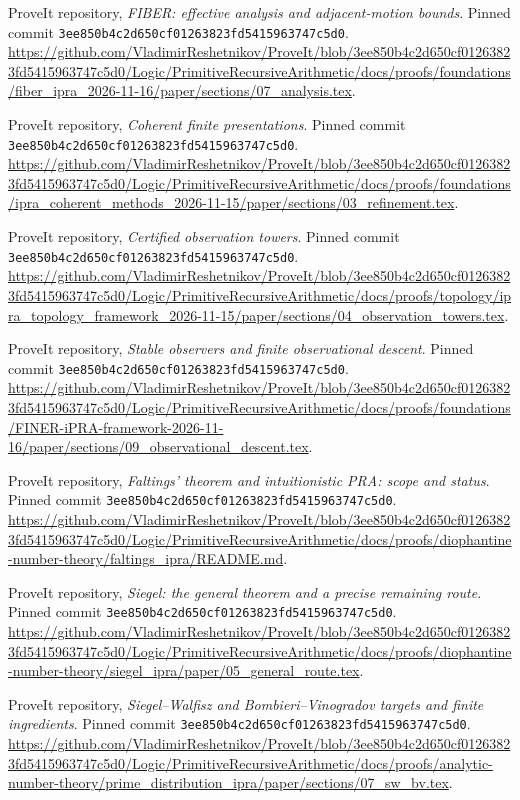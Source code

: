  ProveIt repository, \emph{FIBER: effective analysis and adjacent-motion bounds}.
Pinned commit \texttt{3ee850b4c2d650cf01263823fd5415963747c5d0}.
\url{https://github.com/VladimirReshetnikov/ProveIt/blob/3ee850b4c2d650cf01263823fd5415963747c5d0/Logic/PrimitiveRecursiveArithmetic/docs/proofs/foundations/fiber_ipra_2026-11-16/paper/sections/07_analysis.tex}.

 ProveIt repository, \emph{Coherent finite presentations}.
Pinned commit \texttt{3ee850b4c2d650cf01263823fd5415963747c5d0}.
\url{https://github.com/VladimirReshetnikov/ProveIt/blob/3ee850b4c2d650cf01263823fd5415963747c5d0/Logic/PrimitiveRecursiveArithmetic/docs/proofs/foundations/ipra_coherent_methods_2026-11-15/paper/sections/03_refinement.tex}.

 ProveIt repository, \emph{Certified observation towers}.
Pinned commit \texttt{3ee850b4c2d650cf01263823fd5415963747c5d0}.
\url{https://github.com/VladimirReshetnikov/ProveIt/blob/3ee850b4c2d650cf01263823fd5415963747c5d0/Logic/PrimitiveRecursiveArithmetic/docs/proofs/topology/ipra_topology_framework_2026-11-15/paper/sections/04_observation_towers.tex}.

 ProveIt repository, \emph{Stable observers and finite observational descent}.
Pinned commit \texttt{3ee850b4c2d650cf01263823fd5415963747c5d0}.
\url{https://github.com/VladimirReshetnikov/ProveIt/blob/3ee850b4c2d650cf01263823fd5415963747c5d0/Logic/PrimitiveRecursiveArithmetic/docs/proofs/foundations/FINER-iPRA-framework-2026-11-16/paper/sections/09_observational_descent.tex}.

 ProveIt repository, \emph{Faltings' theorem and intuitionistic PRA: scope and status}.
Pinned commit \texttt{3ee850b4c2d650cf01263823fd5415963747c5d0}.
\url{https://github.com/VladimirReshetnikov/ProveIt/blob/3ee850b4c2d650cf01263823fd5415963747c5d0/Logic/PrimitiveRecursiveArithmetic/docs/proofs/diophantine-number-theory/faltings_ipra/README.md}.

 ProveIt repository, \emph{Siegel: the general theorem and a precise remaining route}.
Pinned commit \texttt{3ee850b4c2d650cf01263823fd5415963747c5d0}.
\url{https://github.com/VladimirReshetnikov/ProveIt/blob/3ee850b4c2d650cf01263823fd5415963747c5d0/Logic/PrimitiveRecursiveArithmetic/docs/proofs/diophantine-number-theory/siegel_ipra/paper/05_general_route.tex}.

 ProveIt repository, \emph{Siegel--Walfisz and Bombieri--Vinogradov targets and finite ingredients}.
Pinned commit \texttt{3ee850b4c2d650cf01263823fd5415963747c5d0}.
\url{https://github.com/VladimirReshetnikov/ProveIt/blob/3ee850b4c2d650cf01263823fd5415963747c5d0/Logic/PrimitiveRecursiveArithmetic/docs/proofs/analytic-number-theory/prime_distribution_ipra/paper/sections/07_sw_bv.tex}.

